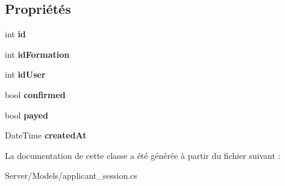 \subsection*{Propriétés}
\begin{DoxyCompactItemize}
\item 
\mbox{\label{class_server_1_1_models_1_1applicant__session_ae8693adb64550ee0d352b8ec6d50c82b}} 
int {\bfseries id}
\item 
\mbox{\label{class_server_1_1_models_1_1applicant__session_a1e2d4e8a962afe2b8d1e0d9e6f07f47d}} 
int {\bfseries id\+Formation}
\item 
\mbox{\label{class_server_1_1_models_1_1applicant__session_ab8c6698951d0af62c24d1f06f21e12b8}} 
int {\bfseries id\+User}
\item 
\mbox{\label{class_server_1_1_models_1_1applicant__session_acfe2166c28e0f488e8e098acedd5d2f6}} 
bool {\bfseries confirmed}
\item 
\mbox{\label{class_server_1_1_models_1_1applicant__session_a04a89f3fa0280d1c12e0d551422d30e7}} 
bool {\bfseries payed}
\item 
\mbox{\label{class_server_1_1_models_1_1applicant__session_a7a05be6c9279c748140de9772c703adc}} 
Date\+Time {\bfseries created\+At}
\end{DoxyCompactItemize}


La documentation de cette classe a été générée à partir du fichier suivant \+:\begin{DoxyCompactItemize}
\item 
Server/\+Models/applicant\+\_\+session.\+cs\end{DoxyCompactItemize}

